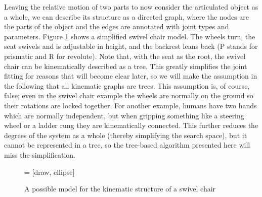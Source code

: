 \documentclass[a4paper,orivec]{llncs}
\begin{document}
Leaving the relative motion of two parts to now consider the articulated object as a whole, we can describe its structure as a directed graph, where the nodes are the parts of the object and the edges are annotated with joint types and parameters. Figure \ref{fig:Sswivel} shows a simplified swivel chair model. The wheels turn, the seat swivels and is adjustable in height, and the backrest leans back (P stands for prismatic and R for revolute). Note that, with the seat as the root, the swivel chair can be kinematically described as a tree. This greatly simplifies the joint fitting for reasons that will become clear later, so we will make the assumption in the following that all kinematic graphs are trees. This assumption is, of course, false; even in the swivel chair example the wheels are normally on the ground so their rotations are locked together. For another example, humans have two hands which are normally independent, but when gripping something like a steering wheel or a ladder rung they are kinematically connected. This further reduces the degrees of the system as a whole (thereby simplifying the search space), but it cannot be represented in a tree, so the tree-based algorithm presented here will miss the simplification.

        \begin{figure}[ht]
          \centering
           = [draw, ellipse]
          \vspace{0.9in}
          \caption{A possible model for the kinematic structure of a swivel chair}
          \label{fig:Sswivel}
          \vspace{-.3in}
        \end{figure}
\end{document}

